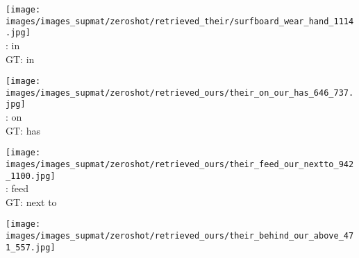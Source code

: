 \documentclass[10pt,twocolumn,letterpaper]{article}
\begin{document}
\begin{figure*}[t]
\begin{minipage}[t]{0.185\textwidth}
       	\vspace{0.2ex}
    \end{minipage}
    \hspace{0.005\textwidth}  
    \begin{minipage}[t]{0.185\textwidth}
    	\centering
       	\texttt{[image: images/images\_supmat/zeroshot/retrieved\_their/surfboard\_wear\_hand\_1114.jpg]}\\
		\vspace{0.3ex}       	
       	\cite{Lu16}: in \\
       	GT: in
      	\vspace{0.2ex}
    \end{minipage} 

    \begin{minipage}[t]{0.185\textwidth}
    	\centering
       	\texttt{[image: images/images\_supmat/zeroshot/retrieved\_ours/their\_on\_our\_has\_646\_737.jpg]}\\
       	\vspace{0.3ex}
       	\cite{Lu16}: on \\
       	GT: has
       	\vspace{2ex}
    \end{minipage}
    \hspace{0.005\textwidth}
    \begin{minipage}[t]{0.185\textwidth}
       \centering
       \texttt{[image: images/images\_supmat/zeroshot/retrieved\_ours/their\_feed\_our\_nextto\_942\_1100.jpg]}\\
       \vspace{0.3ex}
       \cite{Lu16}: feed \\
       GT: next to
       \vspace{0.2ex}
    \end{minipage}
    \hspace{0.005\textwidth}
    \begin{minipage}[t]{0.185\textwidth}
       \centering
       \texttt{[image: images/images\_supmat/zeroshot/retrieved\_ours/their\_behind\_our\_above\_471\_557.jpg]}\\
       \vspace{0.3ex}

\end{minipage}
\end{figure*}
\end{document}
